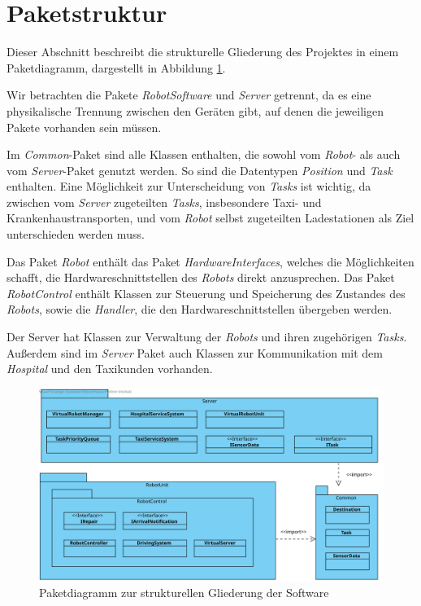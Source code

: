 \section{Paketstruktur}
Dieser Abschnitt beschreibt die strukturelle Gliederung des Projektes in einem Paketdiagramm, dargestellt in Abbildung \ref{Paketstruktur}.

Wir betrachten die Pakete \textit{RobotSoftware} und \textit{Server} getrennt, da es eine physikalische Trennung zwischen den Geräten gibt, auf denen die jeweiligen Pakete vorhanden sein müssen.

Im \textit{Common}-Paket sind alle Klassen enthalten, die sowohl vom \textit{Robot}- als auch vom \textit{Server}-Paket genutzt werden. 
So sind die Datentypen \textit{Position} und \textit{Task} enthalten. 
Eine Möglichkeit zur Unterscheidung von \textit{Tasks} ist wichtig, da zwischen vom \textit{Server} zugeteilten \textit{Tasks}, insbesondere Taxi- und Krankenhaustransporten, und vom \textit{Robot} selbst zugeteilten Ladestationen als Ziel unterschieden werden muss. 

Das Paket \textit{Robot} enthält das Paket \textit{HardwareInterfaces}, welches die Möglichkeiten schafft, die Hardwareschnittstellen des \textit{Robots} direkt anzusprechen. 
Das Paket \textit{RobotControl} enthält Klassen zur Steuerung und Speicherung des Zustandes des \textit{Robots}, sowie die \emph{Handler}, die den Hardwareschnittstellen übergeben werden.

Der Server hat Klassen zur Verwaltung der \textit{Robots} und ihren zugehörigen \textit{Tasks}. 
Außerdem sind im \textit{Server} Paket auch Klassen zur Kommunikation mit dem \textit{Hospital} und den Taxikunden vorhanden.

\begin{figure}[H]
\centering
\includegraphics[height=0.8\textwidth, angle=90]{img/6_paketdiagramm}
\caption{Paketdiagramm zur strukturellen Gliederung der Software}
\label{Paketstruktur}
\end{figure}
